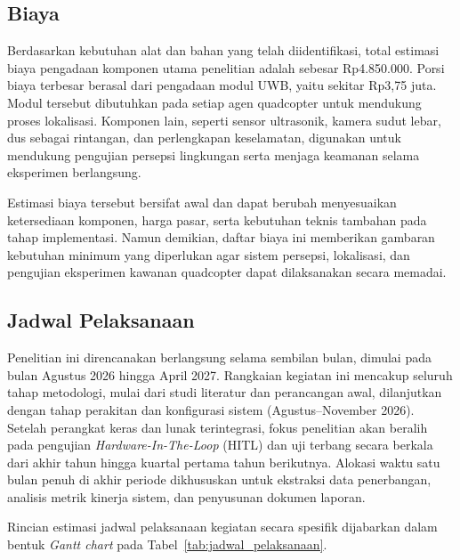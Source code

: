 \documentclass[12pt,a4paper]{report}
\numberwithin{equation}{chapter}
\begin{document}
\subsection{Biaya}
Berdasarkan kebutuhan alat dan bahan yang telah diidentifikasi, total estimasi biaya pengadaan komponen utama penelitian adalah sebesar Rp4.850.000. Porsi biaya terbesar berasal dari pengadaan modul UWB, yaitu sekitar Rp3,75 juta. Modul tersebut dibutuhkan pada setiap agen quadcopter untuk mendukung proses lokalisasi. Komponen lain, seperti sensor ultrasonik, kamera sudut lebar, dus sebagai rintangan, dan perlengkapan keselamatan, digunakan untuk mendukung pengujian persepsi lingkungan serta menjaga keamanan selama eksperimen berlangsung.

Estimasi biaya tersebut bersifat awal dan dapat berubah menyesuaikan ketersediaan komponen, harga pasar, serta kebutuhan teknis tambahan pada tahap implementasi. Namun demikian, daftar biaya ini memberikan gambaran kebutuhan minimum yang diperlukan agar sistem persepsi, lokalisasi, dan pengujian eksperimen kawanan quadcopter dapat dilaksanakan secara memadai.

\subsection{Jadwal Pelaksanaan}
Penelitian ini direncanakan berlangsung selama sembilan bulan, dimulai pada bulan Agustus 2026 hingga April 2027. Rangkaian kegiatan ini mencakup seluruh tahap metodologi, mulai dari studi literatur dan perancangan awal, dilanjutkan dengan tahap perakitan dan konfigurasi sistem (Agustus--November 2026). Setelah perangkat keras dan lunak terintegrasi, fokus penelitian akan beralih pada pengujian \textit{Hardware-In-The-Loop} (HITL) dan uji terbang secara berkala dari akhir tahun hingga kuartal pertama tahun berikutnya. Alokasi waktu satu bulan penuh di akhir periode dikhususkan untuk ekstraksi data penerbangan, analisis metrik kinerja sistem, dan penyusunan dokumen laporan.

Rincian estimasi jadwal pelaksanaan kegiatan secara spesifik dijabarkan dalam bentuk \textit{Gantt chart} pada Tabel~\ref{tab:jadwal_pelaksanaan}.
\end{document}

